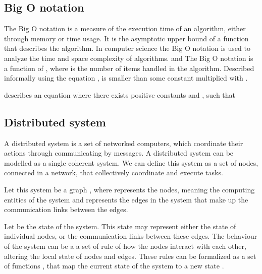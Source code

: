 

\subsection{Big O notation}
 The Big O notation is a measure of the execution time of an algorithm, either through memory or time usage. It is the asymptotic upper bound of a function that describes the algorithm. In computer science the Big O notation is used to analyze the time and space complexity of algorithms. and The Big O notation is a function of , where  is the number of items handled in the algorithm. Described informally using the equation ,  is smaller than some constant multiplied with .

 \begin{Definition}
  describes an equation where there exists positive constants 
  and , such that 
 \end{Definition}
 
\subsection{Distributed system}

A distributed system is a set of networked computers, which coordinate their actions through communicating by messages. A distributed system can be modelled as a single coherent system. We can define this system as a set of nodes, connected in a network, that collectively coordinate and execute tasks.

Let this system be a graph , where  represents the nodes, meaning the computing entities of the system and  represents the edges in the system that make up the communication links between the edges.

Let  be the state of the system. This state may represent either the state of individual nodes, or the communication links between these edges. The behaviour of the system can be a a set of rule of how the nodes interact with each other, altering the local state of nodes and edges. These rules can be formalized as a set of functions , that map the current state of the system  to a new state .

